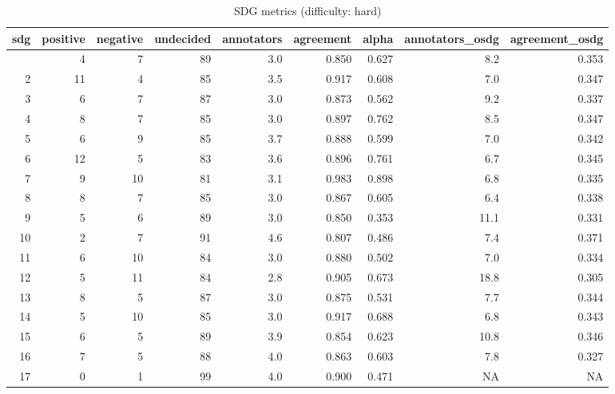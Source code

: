 \begin{table}[t]
\caption*{
{\large SDG metrics (difficulty: hard)}
} 
\fontsize{12.0pt}{14.4pt}\selectfont
\begin{tabular*}{\linewidth}{@{\extracolsep{\fill}}rrrrrrrrr}
\toprule
sdg & positive & negative & undecided & annotators & agreement & alpha & annotators\_osdg & agreement\_osdg \\ 
\midrule\addlinespace[2.5pt]
1 & 4 & 7 & 89 & 3.0 & 0.850 & 0.627 & 8.2 & 0.353 \\ 
2 & 11 & 4 & 85 & 3.5 & 0.917 & 0.608 & 7.0 & 0.347 \\ 
3 & 6 & 7 & 87 & 3.0 & 0.873 & 0.562 & 9.2 & 0.337 \\ 
4 & 8 & 7 & 85 & 3.0 & 0.897 & 0.762 & 8.5 & 0.347 \\ 
5 & 6 & 9 & 85 & 3.7 & 0.888 & 0.599 & 7.0 & 0.342 \\ 
6 & 12 & 5 & 83 & 3.6 & 0.896 & 0.761 & 6.7 & 0.345 \\ 
7 & 9 & 10 & 81 & 3.1 & 0.983 & 0.898 & 6.8 & 0.335 \\ 
8 & 8 & 7 & 85 & 3.0 & 0.867 & 0.605 & 6.4 & 0.338 \\ 
9 & 5 & 6 & 89 & 3.0 & 0.850 & 0.353 & 11.1 & 0.331 \\ 
10 & 2 & 7 & 91 & 4.6 & 0.807 & 0.486 & 7.4 & 0.371 \\ 
11 & 6 & 10 & 84 & 3.0 & 0.880 & 0.502 & 7.0 & 0.334 \\ 
12 & 5 & 11 & 84 & 2.8 & 0.905 & 0.673 & 18.8 & 0.305 \\ 
13 & 8 & 5 & 87 & 3.0 & 0.875 & 0.531 & 7.7 & 0.344 \\ 
14 & 5 & 10 & 85 & 3.0 & 0.917 & 0.688 & 6.8 & 0.343 \\ 
15 & 6 & 5 & 89 & 3.9 & 0.854 & 0.623 & 10.8 & 0.346 \\ 
16 & 7 & 5 & 88 & 4.0 & 0.863 & 0.603 & 7.8 & 0.327 \\ 
17 & 0 & 1 & 99 & 4.0 & 0.900 & 0.471 & NA & NA \\ 
\bottomrule
\end{tabular*}
\end{table}

